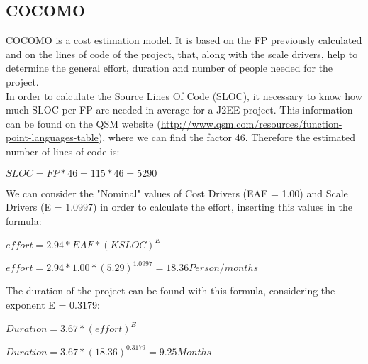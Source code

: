 	\subsection{COCOMO}
		COCOMO is a cost estimation model. It is based on the FP previously calculated and on the lines of code of the project, that, along with the scale drivers, help to determine the general effort, duration and number of people needed for the project.\\
		In order to calculate the Source Lines Of Code (SLOC), it necessary to know how much SLOC per FP are needed in average for a J2EE project. This information can be found on the QSM website (\url{http://www.qsm.com/resources/function-point-languages-table}), where we can find the factor 46. Therefore the estimated number of lines of code is:
		\vspace{0.5cm}	
		\begin{center}
			\begin{math}
				SLOC = FP * 46 = 115 * 46 = 5290
			\end{math}
		\end{center}
		\vspace{0.5cm}
		We can consider the "Nominal" values of Cost Drivers (EAF = 1.00) and Scale Drivers (E = 1.0997) in order to calculate the effort, inserting this values in the formula:
		\vspace{0.5cm}
		\begin{center}
			\begin{math}
				effort = 2.94*EAF*(KSLOC)^{E}
			\end{math}
		\end{center}
		\begin{center}
			\begin{math}
				effort = 2.94*1.00*(5.29)^{1.0997} = 18.36 Person/months
			\end{math}
		\end{center}
		\vspace{0.5cm}
		The duration of the project can be found with this formula, considering the exponent E = 0.3179:
		\vspace{0.5cm}
		\begin{center}
			\begin{math}
				Duration = 3.67*(effort)^{E}
			\end{math}
		\end{center}
		\begin{center}
			\begin{math}
				Duration = 3.67*(18.36)^{0.3179} = 9.25 Months
			\end{math}
		\end{center}
